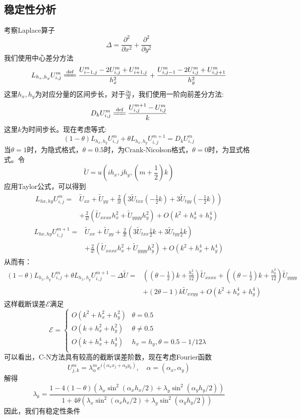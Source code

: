 \documentclass[12pt,fontset=mac]{ctexart}
\newcommand{\eqdef}{\xlongequal{\text{def}}}%
\begin{document}
\subsection{稳定性分析}
考察Laplace算子$$\Delta = \frac{\partial^2}{\partial x^2} + \frac{\partial^2}{\partial y^2}$$
\noindent 我们使用中心差分方法
$$
L_{h_x,h_y}U_{i,j}^m \eqdef \frac{U_{i-1,j}^m-2U_{i,j}^m+U_{i+1,j}^m}{h_x^2} + \frac{U_{i,j-1}^m-2U_{i,j}^m+U_{i,j+1}^m}{h_y^2}
$$
\noindent
这里$h_x,h_y$为对应分量的区间步长，对于$\frac{\partial u}{\partial t}$，\noindent 我们使用一阶向前差分方法:
$$
D_k U_{i,j}^m \eqdef \frac{U_{i,j}^{m+1}-U_{i,j}^m}{k}
$$
这里$k$为时间步长。现在考虑等式:
$$
(1-\theta)L_{h_x,h_y}U_{i,j}^m+\theta L_{h_x,h_y}U_{i,j}^{m+1} = D_kU_{i,j}^m
$$
当$\theta = 1$时，为隐式格式，$\theta=0.5$时，为Crank-Nicolson格式，$\theta=0$时，为显式格式。令
$$\tilde{U} = u\left(ih_x,jh_y,\left(m+\frac{1}{2}\right)k\right)$$
应用Taylor公式，可以得到
$$
\begin{aligned}
L_{hx,hy}U_{i,j}^m =& \tilde{U}_{xx} + \tilde{U}_{yy} + \frac{2}{3!}\left(3\tilde{U}_{txx}\left(-\frac{1}{2}k\right)+3\tilde{U}_{tyy}\left(-\frac{1}{2}k\right)\right) \\
&+\frac{2}{4!}\left(\tilde{U}_{xxxx}h_x^2+\tilde{U}_{yyyy}h_y^2\right)+O(k^2+h_x^4+h_y^4)
\end{aligned}
$$
$$
\begin{aligned}
L_{hx,hy}U_{i,j}^{m+1} =& \tilde{U}_{xx} + \tilde{U}_{yy} + \frac{2}{3!}\left(3\tilde{U}_{txx}\frac{1}{2}k+3\tilde{U}_{tyy}\frac{1}{2}k\right) \\
&+\frac{2}{4!}\left(\tilde{U}_{xxxx}h_x^2+\tilde{U}_{yyyy}h_y^2\right)+O(k^2+h_x^4+h_y^4)
\end{aligned}
$$
从而有：
$$
\begin{aligned}
(1-\theta)L_{h_x,h_y}U_{i,j}^m+\theta L_{h_x,h_y}U_{i,j}^{m+1} - \Delta \tilde{U} =& \left(\left(\theta - \frac{1}{2}\right)k+\frac{h_x^2}{12}\right)\tilde{U}_{xxxx}+\left(\left(\theta - \frac{1}{2}\right)k+\frac{h_y^2}{12}\right)\tilde{U}_{yyyy}\\
&+\left(2\theta - 1\right)k\tilde{U}_{xxyy} + O(k^2+h_x^4+h_y^4)
\end{aligned}
$$
\noindent
这样截断误差$\mathcal{E}$满足
$$
\mathcal{E} = 
\begin{cases}
O(k^2+h_x^2+h_y^2) & \theta = 0.5\\
O(k+h_x^2+h_y^2) & \theta \neq 0.5\\
O(k+h_x^4+h_y^4) & h_x = h_y,\theta = 0.5-1/12\lambda \\
\end{cases}
$$
可以看出，C-N方法具有较高的截断误差阶数，现在考虑Fourier函数
$$U_{j,k}^m =\lambda_{\alpha}^me^{i(\alpha_xx_j+\alpha_yy_k)},\quad \alpha = (\alpha_x, \alpha_y)$$
解得
$$
\lambda_k = \frac{1 - 4(1-\theta)\left(\lambda_x\sin^2(\alpha_xh_x/2)+\lambda_y\sin^2(\alpha_yh_y/2)\right)}{1+4\theta\left(\lambda_x\sin^2(\alpha_xh_x/2)+\lambda_y\sin^2(\alpha_yh_y/2)\right)}
$$
因此，我们有稳定性条件
\end{document}
